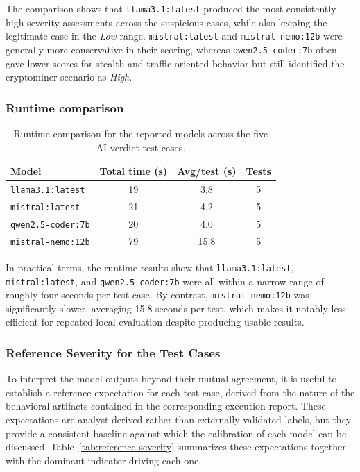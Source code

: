 The comparison shows that \texttt{llama3.1:latest} produced the most consistently high-severity assessments across the suspicious cases, while also keeping the legitimate case in the \textit{Low} range. \texttt{mistral:latest} and \texttt{mistral-nemo:12b} were generally more conservative in their scoring, whereas \texttt{qwen2.5-coder:7b} often gave lower scores for stealth and traffic-oriented behavior but still identified the cryptominer scenario as \textit{High}.

\subsubsection{Runtime comparison}

\begin{table}[h]
\centering
\begin{tabular}{lccc}
\hline
\textbf{Model} & \textbf{Total time (s)} & \textbf{Avg/test (s)} & \textbf{Tests} \\
\hline
\texttt{llama3.1:latest} & 19 & 3.8 & 5 \\
\texttt{mistral:latest} & 21 & 4.2 & 5 \\
\texttt{qwen2.5-coder:7b} & 20 & 4.0 & 5 \\
\texttt{mistral-nemo:12b} & 79 & 15.8 & 5 \\
\hline
\end{tabular}
\caption{Runtime comparison for the reported models across the five AI-verdict test cases.}
\label{tab:ai-agent-runtime-comparison}
\end{table}

In practical terms, the runtime results show that \texttt{llama3.1:latest}, \texttt{mistral:latest}, and \texttt{qwen2.5-coder:7b} were all within a narrow range of roughly four seconds per test case. By contrast, \texttt{mistral-nemo:12b} was significantly slower, averaging 15.8 seconds per test, which makes it notably less efficient for repeated local evaluation despite producing usable results.

\subsubsection{Reference Severity for the Test Cases}
\noindent
To interpret the model outputs beyond their mutual agreement, it is useful to
establish a reference expectation for each test case, derived from the nature of
the behavioral artifacts contained in the corresponding execution report. These
expectations are analyst-derived rather than externally validated labels, but
they provide a consistent baseline against which the calibration of each model
can be discussed. Table~\ref{tab:reference-severity} summarizes these
expectations together with the dominant indicator driving each one.

